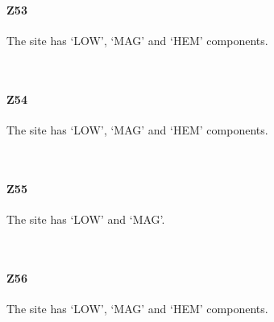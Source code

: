 \documentclass[11pt]{article}
\begin{document}
    \paragraph{Z53}\label{z53}

    The site has `LOW', `MAG' and `HEM' components.



    \begin{center}
    \end{center}
    { \hspace*{\fill} \\}
    
    \paragraph{Z54}\label{z54}

    The site has `LOW', `MAG' and `HEM' components.



    \begin{center}
    \end{center}
    { \hspace*{\fill} \\}
    
    \paragraph{Z55}\label{z55}

    The site has `LOW' and `MAG'.



    \begin{center}
    \end{center}
    { \hspace*{\fill} \\}
    
    \paragraph{Z56}\label{z56}

    The site has `LOW', `MAG' and `HEM' components.
\end{document}
